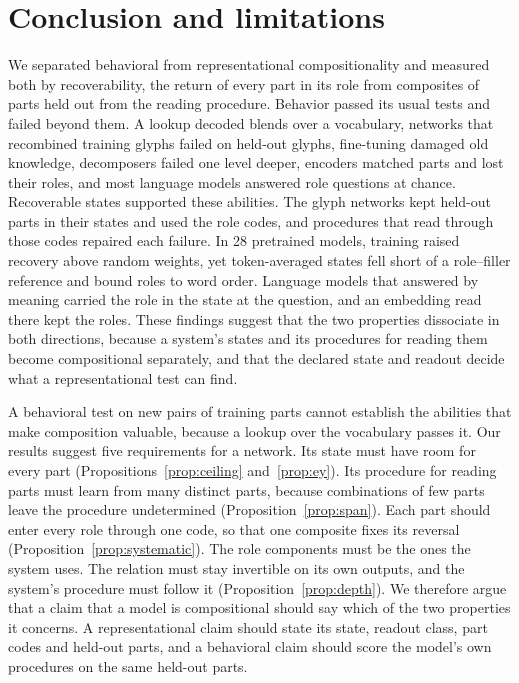 \section{Conclusion and limitations}
\label{sec:discussion}

We separated behavioral from representational compositionality and measured both by recoverability, the return of every part in its role from composites of parts held out from the reading procedure. Behavior passed its usual tests and failed beyond them. A lookup decoded blends over a vocabulary, networks that recombined training glyphs failed on held-out glyphs, fine-tuning damaged old knowledge, decomposers failed one level deeper, encoders matched parts and lost their roles, and most language models answered role questions at chance. Recoverable states supported these abilities. The glyph networks kept held-out parts in their states and used the role codes, and procedures that read through those codes repaired each failure. In 28 pretrained models, training raised recovery above random weights, yet token-averaged states fell short of a role--filler reference and bound roles to word order. Language models that answered by meaning carried the role in the state at the question, and an embedding read there kept the roles. These findings suggest that the two properties dissociate in both directions, because a system's states and its procedures for reading them become compositional separately, and that the declared state and readout decide what a representational test can find.

A behavioral test on new pairs of training parts cannot establish the abilities that make composition valuable, because a lookup over the vocabulary passes it. Our results suggest five requirements for a network. Its state must have room for every part (Propositions~\ref{prop:ceiling} and~\ref{prop:ey}). Its procedure for reading parts must learn from many distinct parts, because combinations of few parts leave the procedure undetermined (Proposition~\ref{prop:span}). Each part should enter every role through one code, so that one composite fixes its reversal (Proposition~\ref{prop:systematic}). The role components must be the ones the system uses. The relation must stay invertible on its own outputs, and the system's procedure must follow it (Proposition~\ref{prop:depth}). We therefore argue that a claim that a model is compositional should say which of the two properties it concerns. A representational claim should state its state, readout class, part codes and held-out parts, and a behavioral claim should score the model's own procedures on the same held-out parts.

